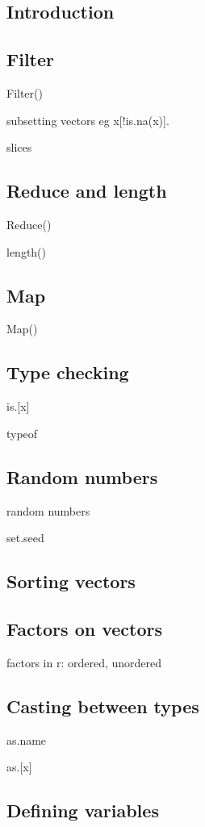 
\subsection{Introduction}


\subsection{Filter}
Filter()


subsetting vectors eg x[!is.na(x)].

slices

\subsection{Reduce and length}
Reduce()

length()
\subsection{Map}
Map()

\subsection{Type checking}
is.[x]

typeof

\subsection{Random numbers}
random numbers

set.seed




\subsection{Sorting vectors}

\subsection{Factors on vectors}
factors in r: ordered, unordered

\subsection{Casting between types}
as.name

as.[x]

\subsection{Defining variables}

